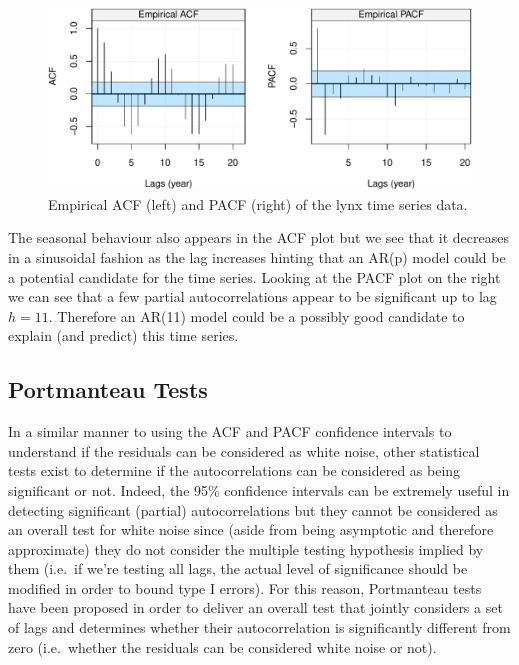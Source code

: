 \documentclass[]{book}
\theoremstyle{definition}
\theoremstyle{definition}
\theoremstyle{definition}
\theoremstyle{remark}
\begin{document}
\begin{figure}

{\centering \includegraphics{ts_files/figure-latex/unnamed-chunk-47-1} 

}

\caption{Empirical ACF (left) and PACF (right) of the lynx time series data.}\label{fig:unnamed-chunk-47}
\end{figure}

The seasonal behaviour also appears in the ACF plot but we see that it
decreases in a sinusoidal fashion as the lag increases hinting that an
AR(p) model could be a potential candidate for the time series. Looking
at the PACF plot on the right we can see that a few partial
autocorrelations appear to be significant up to lag \(h=11\). Therefore
an AR(11) model could be a possibly good candidate to explain (and
predict) this time series.

\subsection{Portmanteau Tests}\label{portmanteau-tests}

In a similar manner to using the ACF and PACF confidence intervals to
understand if the residuals can be considered as white noise, other
statistical tests exist to determine if the autocorrelations can be
considered as being significant or not. Indeed, the 95\% confidence
intervals can be extremely useful in detecting significant (partial)
autocorrelations but they cannot be considered as an overall test for
white noise since (aside from being asymptotic and therefore
approximate) they do not consider the multiple testing hypothesis
implied by them (i.e.~if we're testing all lags, the actual level of
significance should be modified in order to bound type I errors). For
this reason, Portmanteau tests have been proposed in order to deliver an
overall test that jointly considers a set of lags and determines whether
their autocorrelation is significantly different from zero (i.e.~whether
the residuals can be considered white noise or not).
\end{document}
